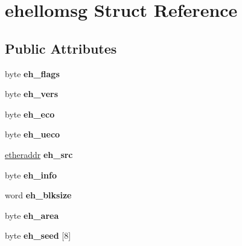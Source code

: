 \hypertarget{structehellomsg}{
\section{ehellomsg Struct Reference}
\label{structehellomsg}
}
\subsection*{Public Attributes}
\begin{DoxyCompactItemize}
\item 
\hypertarget{structehellomsg_ad37fd233691677f89ad7ec68c83d167b}{
byte {\bfseries eh\_\-flags}}
\label{structehellomsg_ad37fd233691677f89ad7ec68c83d167b}

\item 
\hypertarget{structehellomsg_aa451ad848214c67f7e8bb5881bf927d5}{
byte {\bfseries eh\_\-vers}}
\label{structehellomsg_aa451ad848214c67f7e8bb5881bf927d5}

\item 
\hypertarget{structehellomsg_adc5f93bdf00368fbcfa5655fea7fd08f}{
byte {\bfseries eh\_\-eco}}
\label{structehellomsg_adc5f93bdf00368fbcfa5655fea7fd08f}

\item 
\hypertarget{structehellomsg_af306519977fbdd4e5b36f8afa872b4dc}{
byte {\bfseries eh\_\-ueco}}
\label{structehellomsg_af306519977fbdd4e5b36f8afa872b4dc}

\item 
\hypertarget{structehellomsg_a407a8748f85877354c3a8abe4ff91f21}{
\hyperlink{unionetheraddress}{etheraddr} {\bfseries eh\_\-src}}
\label{structehellomsg_a407a8748f85877354c3a8abe4ff91f21}

\item 
\hypertarget{structehellomsg_a4bca536291bcaf1649f5da82333a0110}{
byte {\bfseries eh\_\-info}}
\label{structehellomsg_a4bca536291bcaf1649f5da82333a0110}

\item 
\hypertarget{structehellomsg_ae941100ef4e02b2ce3d762d7e6bed08d}{
word {\bfseries eh\_\-blksize}}
\label{structehellomsg_ae941100ef4e02b2ce3d762d7e6bed08d}

\item 
\hypertarget{structehellomsg_a689003502dee3234c76a59cf67b33d6f}{
byte {\bfseries eh\_\-area}}
\label{structehellomsg_a689003502dee3234c76a59cf67b33d6f}

\item 
\hypertarget{structehellomsg_aa48ee107097d0451e49e4f92407ea3ec}{
byte {\bfseries eh\_\-seed} \mbox{[}8\mbox{]}}
\label{structehellomsg_aa48ee107097d0451e49e4f92407ea3ec}


\end{DoxyCompactItemize}
